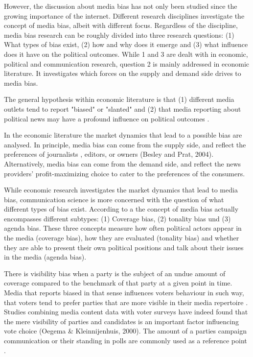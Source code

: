 \documentclass[12pt,a4paper,notitlepage]{article}
\begin{document}
However, the discussion about media bias has not only been studied since the growing importance of the internet. Different research disciplines investigate the concept of media bias, albeit with different focus. Regardless of the discipline, media bias research can be roughly divided into three research questions: (1) What types of bias exist, (2) how and why does it emerge and (3) what influence does it have on the political outcomes. While 1 and 3 are dealt with in economic, political and communication research, question 2 is mainly addressed in economic literature. It investigates which forces on the supply and demand side drives to media bias.  

The general hypothesis within economic literature is that (1) different media outlets tend to report "biased" or "slanted" \citep{groseclose_measure_2005, lott_is_2014} and (2) that media reporting about political news may have a profound influence on political outcomes \citep{gentzkow_media_2004, stromberg_radios_2004, dellavigna_fox_2006, snyder_press_2010, gentzkow_television_2006}. 

In the economic literature the market dynamics that lead to a possible bias are analysed. In principle, media bias can come from the supply side, and reflect the preferences of journalists \citep{baron_persistent_2006}, editors, or owners (Besley and Prat, 2004). Alternatively, media bias can come from the demand side, and reflect the news providers' profit-maximizing choice to cater to the preferences of the consumers. 


 While economic research investigates the market dynamics that lead to media bias, communication science is more concerned with the question of what different types of bias exist. According to a \citet{dalessio_media_2000} the concept of media bias actually encompasses different subtypes: (1) Coverage bias, (2) tonality bias und (3) agenda bias. These three concepts measure how often political actors appear in the media (coverage bias), how they are evaluated (tonality bias) and whether they are able to present their own political positions and talk about their issues in the media (agenda bias).
 
There is visibility bias when a party is the subject of an undue amount of coverage compared to the benchmark of that party at a given point in time. Media that reports biased in that sense influences voters behaviour in such way, that voters tend to prefer parties that are more visible in their media repertoire \citep{eberl_one_2017}. Studies combining media content data with voter surveys have indeed found that the mere visibility of parties and candidates is an important factor influencing vote choice (Oegema & Kleinnijenhuis, 2000). The amount of a parties campaign communication or their standing in polls are commonly used as a reference point \citep{junque_de_fortuny_media_2012, hopmann_political_2012}. 
\end{document}
